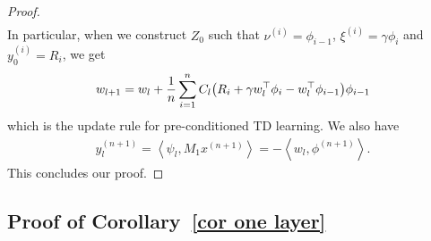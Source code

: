 \documentclass{article}
\newcommand{\indot}[2]{{\left<#1, #2\right>}}
\begin{document}
\begin{proof}
\begin{align}
    \end{align}
    In particular, when we construct $Z_0$ such that $\nu^{(i)} = \phi_{i-1}$, $\xi^{(i)} = \gamma \phi_i$ and $y_0^{(i)} = R_i$,
    we get
    \begin{align}
        w_{l+1} = w_l + \frac{1}{n}\sum_{i=1}^n C_l \qty(R_i + \gamma w_l^\top \phi_i - w_l^\top \phi_{i-1}) \phi_{i-1}
    \end{align}
    which is the update rule for pre-conditioned TD learning.
    We also have
    \begin{align}
        y_l^{(n+1)}
        = \indot{\psi_l}{M_1 x^{(n+1)}}
        = -\indot{w_l}{\phi^{(n+1)}}.
    \end{align}
    This concludes our proof.
    \end{proof}
\subsection{Proof of Corollary~\ref{cor one layer}} \label{appendix: proof cor one layer}
\end{document}
